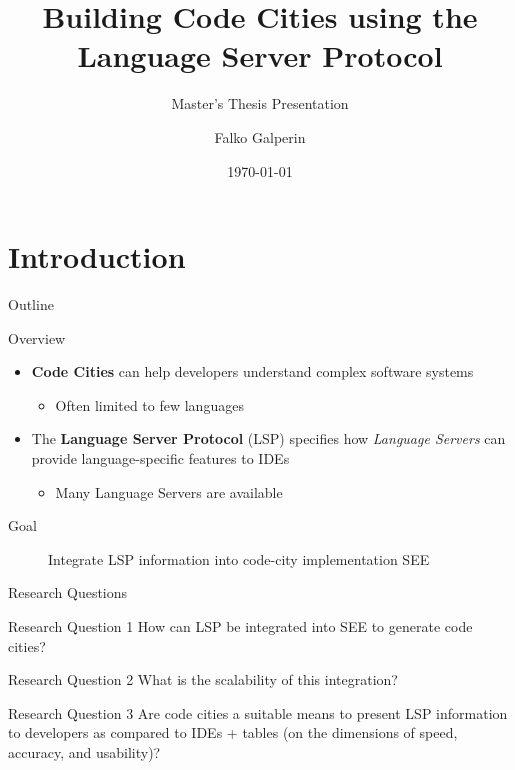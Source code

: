 \documentclass[xcolor={dvipsnames},aspectratio=169,compress]{beamer} %
\title{Building Code Cities using the Language Server Protocol}
\subtitle{Master's Thesis Presentation}
\author{Falko Galperin}
\institute[Uni Bremen]{%
  Faculty 3---Mathematics \& Computer Science \\
  University of Bremen
}
\date{\today}
\newcommand{\follows}{\raisebox{-0.7mm}{\scalebox{1.4}{\textcolor{Maroon}{\ding{43}}}}}
\newcommand{\answer}[1]{\begin{description}\item[\follows{}]{#1}\end{description}}
\begin{document}
{
\begin{frame}
	\titlepage
\end{frame}
}

\section{Introduction}

\begin{frame}{Outline}
	\tableofcontents
\end{frame}

\begin{frame}{Overview}
	\begin{itemize}
		\item \textbf{Code Cities} can help developers understand complex software systems
		      \begin{itemize}
			      \item Often limited to few languages
		      \end{itemize}
		\item The \textbf{Language Server Protocol} (LSP) specifies how \emph{Language Servers} can provide language-specific features to IDEs
		      \begin{itemize}
			      \item Many Language Servers are available
		      \end{itemize}
	\end{itemize}
	\begin{block}{Goal}
		\answer{Integrate LSP information into code-city implementation SEE}
	\end{block}


\end{frame}

\begin{frame}{Research Questions}
	\begin{alertblock}{Research Question 1}
		How can LSP be integrated into SEE to generate code cities?
	\end{alertblock}

	\begin{exampleblock}{Research Question 2}
		What is the scalability of this integration?
	\end{exampleblock}

	\begin{block}{Research Question 3}
		Are code cities a suitable means to present LSP information to developers as compared to IDEs + tables (on the dimensions of speed, accuracy, and usability)?
	\end{block}
\end{frame}
\end{document}
